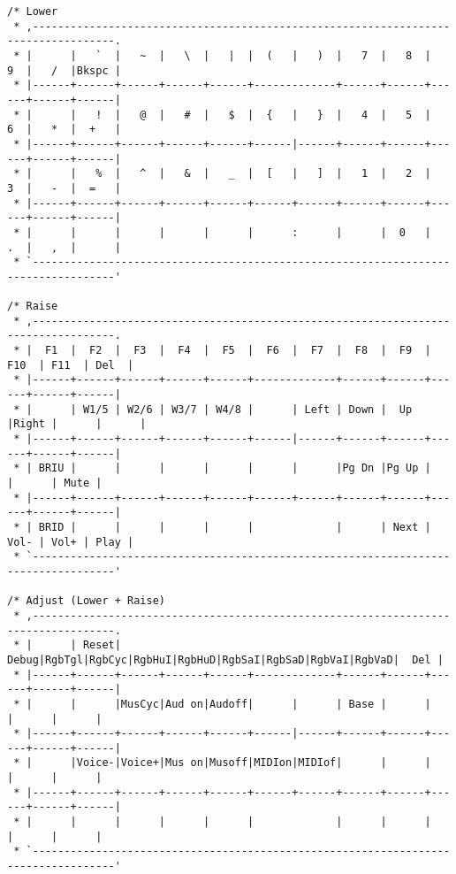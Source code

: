 \documentclass[12pt,a4paper]{report}
\begin{document}
\begin{verbatim}
/* Lower
 * ,-----------------------------------------------------------------------------------.
 * |      |   `  |   ~  |   \  |   |  |  (   |   )  |   7  |   8  |   9  |   /  |Bkspc |
 * |------+------+------+------+------+-------------+------+------+------+------+------|
 * |      |   !  |   @  |   #  |   $  |  {   |   }  |   4  |   5  |   6  |   *  |  +   |
 * |------+------+------+------+------+------|------+------+------+------+------+------|
 * |      |   %  |   ^  |   &  |   _  |  [   |   ]  |   1  |   2  |   3  |   -  |  =   |
 * |------+------+------+------+------+------+------+------+------+------+------+------|
 * |      |      |      |      |      |      :      |      |  0   |   .  |   ,  |      |
 * `-----------------------------------------------------------------------------------'

/* Raise
 * ,-----------------------------------------------------------------------------------.
 * |  F1  |  F2  |  F3  |  F4  |  F5  |  F6  |  F7  |  F8  |  F9  | F10  | F11  | Del  |
 * |------+------+------+------+------+-------------+------+------+------+------+------|
 * |      | W1/5 | W2/6 | W3/7 | W4/8 |      | Left | Down |  Up  |Right |      |      |
 * |------+------+------+------+------+------|------+------+------+------+------+------|
 * | BRIU |      |      |      |      |      |      |Pg Dn |Pg Up |      |      | Mute |
 * |------+------+------+------+------+------+------+------+------+------+------+------|
 * | BRID |      |      |      |      |             |      | Next | Vol- | Vol+ | Play |
 * `-----------------------------------------------------------------------------------'

/* Adjust (Lower + Raise)
 * ,-----------------------------------------------------------------------------------.
 * |      | Reset| Debug|RgbTgl|RgbCyc|RgbHuI|RgbHuD|RgbSaI|RgbSaD|RgbVaI|RgbVaD|  Del |
 * |------+------+------+------+------+-------------+------+------+------+------+------|
 * |      |      |MusCyc|Aud on|Audoff|      |      | Base |      |      |      |      |
 * |------+------+------+------+------+------|------+------+------+------+------+------|
 * |      |Voice-|Voice+|Mus on|Musoff|MIDIon|MIDIof|      |      |      |      |      |
 * |------+------+------+------+------+------+------+------+------+------+------+------|
 * |      |      |      |      |      |             |      |      |      |      |      |
 * `-----------------------------------------------------------------------------------'
\end{verbatim}
\end{document}
